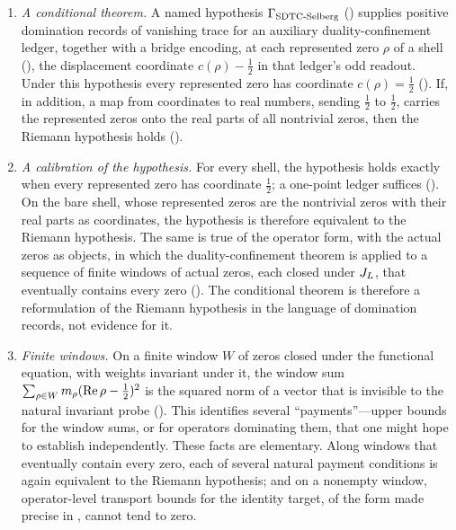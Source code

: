 \begin{enumerate}
  \item \emph{A conditional theorem.}  A named hypothesis
    \(\Gamma_{\mathrm{SDTC\text{-}Selberg}}\) () supplies
    positive domination records of vanishing trace for an auxiliary
    duality-confinement ledger, together with a bridge encoding, at each represented zero \(\rho\) of a
    shell (), the displacement coordinate
    \(c(\rho)-\frac12\) in that ledger's odd readout.  Under
    this hypothesis every represented zero has coordinate
    \(c(\rho)=\frac12\) ().  If,
    in addition, a map from coordinates to real numbers, sending
    \(\frac12\) to \(\frac12\), carries the represented zeros onto the
    real parts of all nontrivial zeros, then the Riemann hypothesis
    holds ().
  \item \emph{A calibration of the hypothesis.}  For every shell, the hypothesis holds exactly when every represented zero
    has coordinate \(\frac12\); a one-point ledger suffices
    ().  On the bare shell, whose
    represented zeros are the nontrivial zeros with their real parts as
    coordinates, the hypothesis is therefore equivalent to the Riemann
    hypothesis.  The same is true of the operator form, with the actual zeros as
    objects, in which the duality-confinement theorem is applied to a
    sequence of finite windows of actual zeros,
    each closed under \(J_{L}\), that eventually contains every zero
    ().  The conditional theorem
    is therefore a reformulation of the Riemann hypothesis in the
    language of domination records, not evidence for it.
  \item \emph{Finite windows.}  On a finite window \(W\) of zeros
    closed under the functional equation, with weights invariant under
    it, the window sum \(\sum_{\rho\in W}m_\rho(\operatorname{Re}\rho-\frac12)^2\)
    is the squared norm of a vector that is invisible to the natural
    invariant probe ().  This identifies several ``payments''---upper bounds for the window
    sums, or for operators dominating them, that one might hope to
    establish independently.
    These facts are elementary.  Along windows that eventually contain
    every zero, each of several natural payment conditions is again
    equivalent to the Riemann hypothesis; and on a nonempty window, operator-level transport bounds for the
    identity target, of the form made precise in
    , cannot tend to zero.
\end{enumerate}

